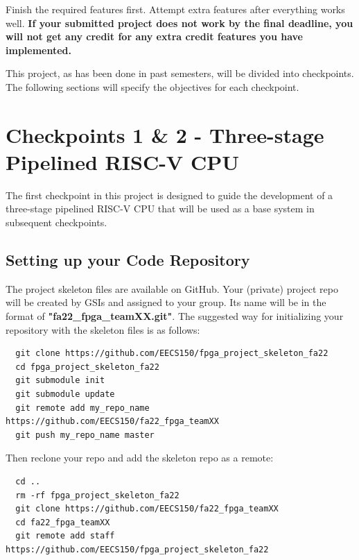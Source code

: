 \documentclass[11pt]{article}
\begin{document}
Finish the required features first.
Attempt extra features after everything works well.
\textbf{If your submitted project does not work by the final deadline, you will not get any credit for any extra credit features you have implemented.}

This project, as has been done in past semesters, will be divided into checkpoints. The following sections will specify the objectives for each checkpoint.

\newpage
\section{Checkpoints 1 \& 2 - Three-stage Pipelined RISC-V CPU}
The first checkpoint in this project is designed to guide the development of a three-stage pipelined RISC-V CPU that will be used as a base system in subsequent checkpoints.



\subsection{Setting up your Code Repository}
The project skeleton files are available on GitHub. Your (private) project repo will be created by GSIs and assigned to your group. Its name will be in the format of \textbf{"fa22\_fpga\_teamXX.git"}.
The suggested way for initializing your repository with the skeleton files is as follows:

\begin{verbatim}
  git clone https://github.com/EECS150/fpga_project_skeleton_fa22
  cd fpga_project_skeleton_fa22
  git submodule init
  git submodule update
  git remote add my_repo_name https://github.com/EECS150/fa22_fpga_teamXX
  git push my_repo_name master
\end{verbatim}

Then reclone your repo and add the skeleton repo as a remote:
\begin{verbatim}
  cd ..
  rm -rf fpga_project_skeleton_fa22
  git clone https://github.com/EECS150/fa22_fpga_teamXX
  cd fa22_fpga_teamXX
  git remote add staff https://github.com/EECS150/fpga_project_skeleton_fa22
\end{verbatim}
\end{document}
